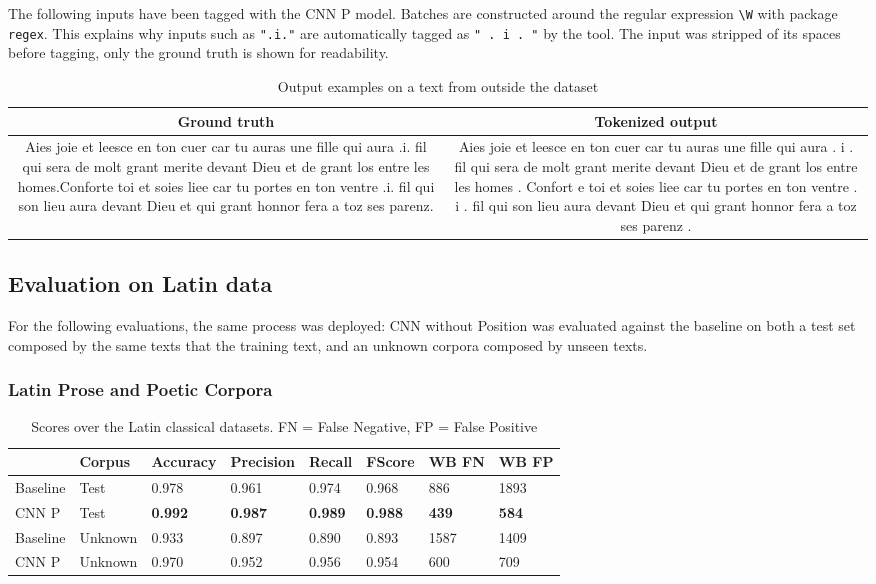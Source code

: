 \documentclass{jdmdh}
\begin{document}
The following inputs have been tagged with the CNN P model. Batches are constructed around the regular expression \texttt{\textbackslash{}W} with package \texttt{regex}. This explains why inputs such as \texttt{".i."} are automatically tagged as \texttt{" . i . "} by the tool. The input was stripped of its spaces before tagging, only the ground truth is shown for readability.

\begin{table}[!ht]
\centering
\begin{tabularx}{\textwidth}{|C|C|}
\hline
\textbf{Ground truth} & \textbf{Tokenized output} \\\hline
Aies joie et leesce en ton cuer car tu auras une fille qui aura .i. fil qui sera de molt grant merite devant Dieu et de grant los entre les homes.Conforte toi et soies liee car tu portes en ton ventre .i. fil qui son lieu aura devant Dieu et qui grant honnor fera a toz ses parenz. & Aies joie et leesce en ton cuer car tu auras une fille qui aura .  i .  fil qui sera de molt grant merite devant Dieu et de grant los entre les homes .  Confort e toi et soies liee car tu portes en ton ventre .  i .  fil qui son lieu aura devant Dieu et qui grant honnor fera a toz ses parenz .
\\\hline
\end{tabularx}
\caption{Output examples on a text from outside the dataset}
\label{tab:example_output}
\end{table}

\subsection{Evaluation on Latin data}

For the following evaluations, the same process was deployed: CNN without Position was evaluated against the baseline on both a test set composed by the same texts that the training text, and an unknown corpora composed by unseen texts.

\subsubsection{Latin Prose and Poetic Corpora}

\begin{table}[H]
\centering
\begin{tabular}{llllllll}
\hline
 & Corpus & Accuracy & Precision & Recall & FScore & WB FN & WB FP \\ \hline
Baseline & Test & 0.978 & 0.961 & 0.974 & 0.968 & 886 & 1893 \\
CNN P & Test & \textbf{0.992} & \textbf{0.987} & \textbf{0.989} & \textbf{0.988} & \textbf{439} & \textbf{584} \\ \hline
Baseline & Unknown & 0.933 & 0.897 & 0.890 & 0.893 & 1587 & 1409 \\
CNN P & Unknown & 0.970 & 0.952 & 0.956 & 0.954 & 600 & 709 \\ \hline
\end{tabular}
\caption{Scores over the Latin classical datasets. FN = False Negative, FP = False Positive}
\label{tab:latin_corpora}
\end{table}
\end{document}
